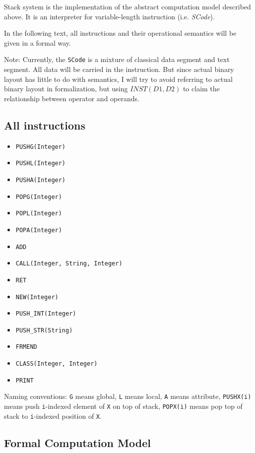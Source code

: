 \documentclass[]{article}
\numberwithin{equation}{section}
\numberwithin{figure}{section}
\numberwithin{table}{section}
\begin{document}
Stack system is the implementation of the abstract computation model
described above. It is an interpreter for variable-length instruction
(i.e. \emph{SCode}).

In the following text, all instructions and their operational semantics
will be given in a formal way.

Note: Currently, the \texttt{SCode} is a mixture of classical data
segment and text segment. All data will be carried in the instruction.
But since actual binary layout has little to do with semantics, I will
try to avoid referring to actual binary layout in formalization, but
using $INST(D1, D2)$ to claim the relationship between operator and
operands.

\subsection{All instructions}\label{all-instructions}

\begin{itemize}
\itemsep1pt\parskip0pt
\item
  \texttt{PUSHG(Integer)}
\item
  \texttt{PUSHL(Integer)}
\item
  \texttt{PUSHA(Integer)}
\item
  \texttt{POPG(Integer)}
\item
  \texttt{POPL(Integer)}
\item
  \texttt{POPA(Integer)}
\item
  \texttt{ADD}
\item
  \texttt{CALL(Integer, String, Integer)}
\item
  \texttt{RET}
\item
  \texttt{NEW(Integer)}
\item
  \texttt{PUSH\_INT(Integer)}
\item
  \texttt{PUSH\_STR(String)}
\item
  \texttt{FRMEND}
\item
  \texttt{CLASS(Integer, Integer)}
\item
  \texttt{PRINT}
\end{itemize}

Naming conventions: \texttt{G} means global, \texttt{L} means local,
\texttt{A} means attribute, \texttt{PUSHX(i)} means push
\texttt{i}-indexed element of \texttt{X} on top of stack,
\texttt{POPX(i)} means pop top of stack to \texttt{i}-indexed position
of \texttt{X}.

\subsection{Formal Computation Model}\label{formal-computation-model}
\end{document}
